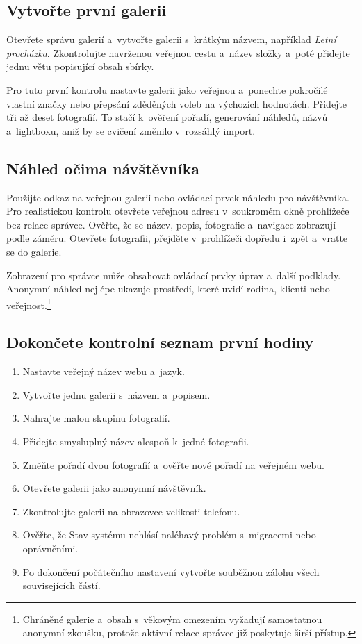 \documentclass[11pt,a4paper]{article}
\begin{document}
\subsection{Vytvořte první galerii}

Otevřete správu galerií a~vytvořte galerii s~krátkým názvem, například
\emph{Letní procházka}. Zkontrolujte navrženou veřejnou cestu a~název složky
a~poté přidejte jednu větu popisující obsah sbírky.

Pro tuto první kontrolu nastavte galerii jako veřejnou a~ponechte pokročilé
vlastní značky nebo přepsání zděděných voleb na výchozích hodnotách. Přidejte
tři až deset fotografií. To stačí k~ověření pořadí, generování náhledů, názvů
a~lightboxu, aniž by se cvičení změnilo v~rozsáhlý import.

\subsection{Náhled očima návštěvníka}

Použijte odkaz na veřejnou galerii nebo ovládací prvek náhledu pro návštěvníka.
Pro realistickou kontrolu otevřete veřejnou adresu v~soukromém okně prohlížeče
bez relace správce. Ověřte, že se název, popis, fotografie a~navigace zobrazují
podle záměru. Otevřete fotografii, přejděte v~prohlížeči dopředu i~zpět a~vraťte
se do galerie.

Zobrazení pro správce může obsahovat ovládací prvky úprav a~další podklady.
Anonymní náhled nejlépe ukazuje prostředí, které uvidí rodina, klienti nebo
veřejnost.\footnote{Chráněné galerie a~obsah s~věkovým omezením vyžadují
samostatnou anonymní zkoušku, protože aktivní relace správce již poskytuje širší
přístup.}

\subsection{Dokončete kontrolní seznam první hodiny}

\begin{enumerate}
  \item Nastavte veřejný název webu a~jazyk.
  \item Vytvořte jednu galerii s~názvem a~popisem.
  \item Nahrajte malou skupinu fotografií.
  \item Přidejte smysluplný název alespoň k~jedné fotografii.
  \item Změňte pořadí dvou fotografií a~ověřte nové pořadí na veřejném webu.
  \item Otevřete galerii jako anonymní návštěvník.
  \item Zkontrolujte galerii na obrazovce velikosti telefonu.
  \item Ověřte, že Stav systému nehlásí naléhavý problém s~migracemi nebo
  oprávněními.
  \item Po dokončení počátečního nastavení vytvořte souběžnou zálohu všech
  souvisejících částí.
\end{enumerate}
\end{document}
